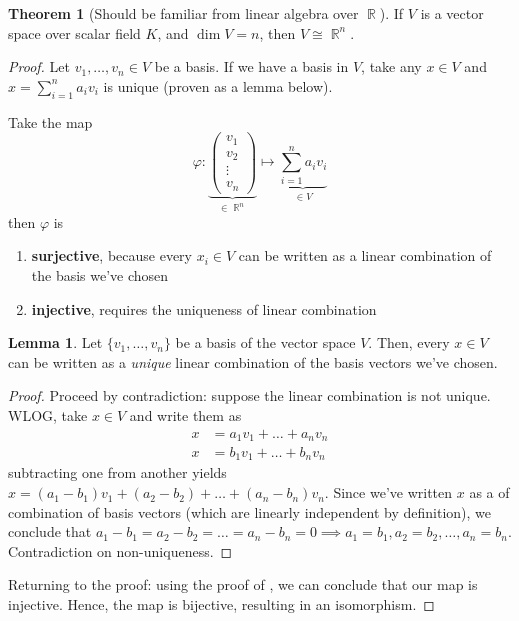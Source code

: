 \documentclass[11pt]{amsart} %
\theoremstyle{definition}
\newtheorem{theorem}[definition]{Theorem}
\newtheorem{lemma}[definition]{Lemma}
\theoremstyle{definition}
\DeclareMathOperator{\R}{\mathbb{R}}
\numberwithin{equation}{section}
\begin{document}
\begin{theorem}[Should be familiar from linear algebra over $\R$]
	If $V$ is a vector space over scalar field $K$, and $\dim V=n$, then $V \cong \R^n$.
\end{theorem}

\begin{proof}
	Let $v_1,\dots,v_n \in V$ be a basis. If we have a basis in $V$, take any $x \in V$ and $x= \sum_{i=1}^{n} a_i v_i$ is unique (proven as a lemma below).
	
	Take the map
	$$\varphi : \underbrace{\left( \begin{array}{c} v_1 \\ v_2 \\ \vdots \\ v_n \end{array} \right) }_{\in \R^n}   \mapsto  \underbrace{\sum_{i=1}^{n} a_i v_i}_{\in V}  $$
	then $\varphi$ is
	\begin{enumerate}%
		\item \textbf{surjective}, because every $x_i \in V$ can be written as a linear combination of the basis we've chosen
		\item \textbf{injective}, requires the uniqueness of linear combination
	\end{enumerate}

	\begin{lemma}
		\label{uniquenessofbasis}
		Let $\{v_1,\dots,v_n \}$ be a basis of the vector space $V$. Then, every $x \in V$ can be written as a \textit{unique} linear combination of the basis vectors we've chosen.
	\end{lemma}
	
	\begin{proof}
		Proceed by contradiction: suppose the linear combination is not unique. WLOG, take $x\in V$ and write them as
		\begin{align*}
		x &= a_1 v_1 + \dots +  a_n v_n \\
		x &= b_1 v_1 + \dots +  b_n v_n
		\end{align*}
		subtracting one from another yields $x = (a_1-b_1) v_1 + (a_2 - b_2) + \dots  + (a_n-b_n) v_n$. Since we've written $x$ as a of combination of basis vectors (which are linearly independent by definition), we conclude that $a_1-b_1=a_2-b_2=\dots=a_n-b_n=0 \implies a_1=b_1,a_2=b_2,\dots,a_n=b_n$. Contradiction on non-uniqueness.
	\end{proof}
	Returning to the proof: using the proof of , we can conclude that our map is injective. Hence, the map is bijective, resulting in an isomorphism.
\end{proof}
\end{document}
